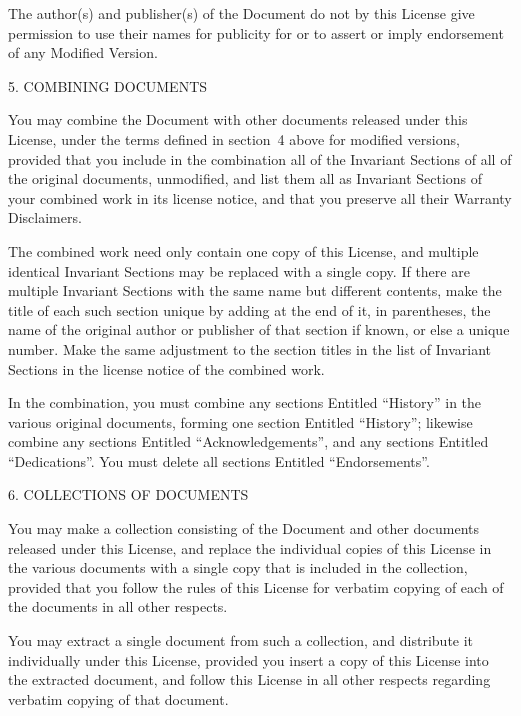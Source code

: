 \documentclass[10pt,a4paper,final]{book}
\begin{document}
{The author(s) and publisher(s) of the Document do not by this License
give permission to use their names for publicity for or to assert or
imply endorsement of any Modified Version.


\begin{center}
{\Large 5. COMBINING DOCUMENTS\par}
\end{center}


You may combine the Document with other documents released under this
License, under the terms defined in section~4 above for modified
versions, provided that you include in the combination all of the
Invariant Sections of all of the original documents, unmodified, and
list them all as Invariant Sections of your combined work in its
license notice, and that you preserve all their Warranty Disclaimers.

The combined work need only contain one copy of this License, and
multiple identical Invariant Sections may be replaced with a single
copy.  If there are multiple Invariant Sections with the same name but
different contents, make the title of each such section unique by
adding at the end of it, in parentheses, the name of the original
author or publisher of that section if known, or else a unique number.
Make the same adjustment to the section titles in the list of
Invariant Sections in the license notice of the combined work.

In the combination, you must combine any sections Entitled ``History''
in the various original documents, forming one section Entitled
``History''; likewise combine any sections Entitled ``Acknowledgements'',
and any sections Entitled ``Dedications''.  You must delete all sections
Entitled ``Endorsements''.

\begin{center}
{\Large 6. COLLECTIONS OF DOCUMENTS\par}
\end{center}

You may make a collection consisting of the Document and other documents
released under this License, and replace the individual copies of this
License in the various documents with a single copy that is included in
the collection, provided that you follow the rules of this License for
verbatim copying of each of the documents in all other respects.

You may extract a single document from such a collection, and distribute
it individually under this License, provided you insert a copy of this
License into the extracted document, and follow this License in all
other respects regarding verbatim copying of that document.


}
\end{document}
